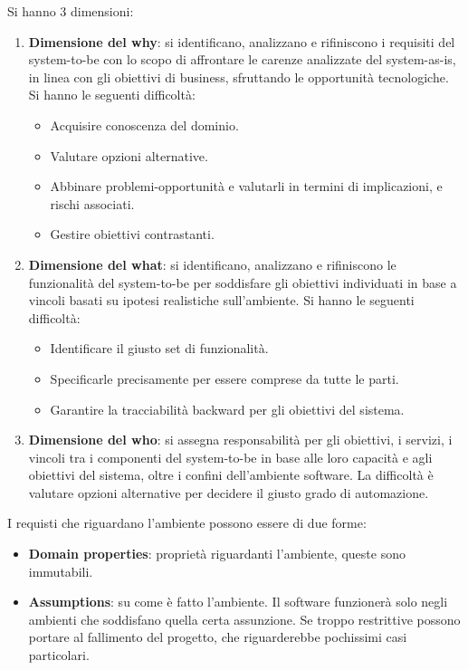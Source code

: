 Si hanno 3 dimensioni:
\begin{enumerate}
      \item \textbf{Dimensione del why}: si identificano, analizzano e rifiniscono
            i requisiti del system-to-be con lo scopo di affrontare le carenze
            analizzate del system-as-is, in linea con gli obiettivi di business,
            sfruttando le opportunità tecnologiche. Si hanno le seguenti difficoltà:
            \begin{itemize}
                  \item Acquisire conoscenza del dominio.
                  \item Valutare opzioni alternative.
                  \item Abbinare problemi-opportunità e valutarli in termini di
                        implicazioni, e rischi associati.
                  \item Gestire obiettivi contrastanti.
            \end{itemize}
      \item \textbf{Dimensione del what}: si identificano, analizzano e rifiniscono
            le funzionalità del system-to-be per soddisfare gli obiettivi
            individuati in base a vincoli basati su ipotesi realistiche
            sull'ambiente. Si hanno le seguenti difficoltà:
            \begin{itemize}
                  \item Identificare il giusto set di funzionalità.
                  \item Specificarle precisamente per essere comprese da tutte
                        le parti.
                  \item Garantire la tracciabilità backward per gli obiettivi
                        del sistema.
            \end{itemize}
      \item \textbf{Dimensione del who}: si assegna responsabilità per gli
            obiettivi, i servizi, i vincoli tra i componenti del system-to-be in
            base alle loro capacità e agli obiettivi del sistema, oltre i confini
            dell'ambiente software. La difficoltà è valutare opzioni alternative
            per decidere il giusto grado di automazione.
\end{enumerate}
I requisti che riguardano l'ambiente possono essere di due forme:
\begin{itemize}
      \item \textbf{Domain properties}: proprietà riguardanti l'ambiente, queste
            sono immutabili.
      \item \textbf{Assumptions}: su come è fatto l'ambiente. Il software
            funzionerà solo negli ambienti che soddisfano quella certa assunzione.
            Se troppo restrittive possono portare al fallimento del progetto,
            che riguarderebbe pochissimi casi particolari.
\end{itemize}
